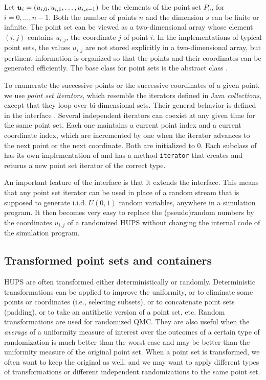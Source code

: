 Let $\mbox{\boldmath $u$}_i = (u_{i,0}, u_{i,1}, \dots, u_{i,s-1})$
be the elements of the point set $P_n$, for $i=0,\dots,n-1$.
Both the number of points $n$ and the dimension $s$ can be finite
or infinite.  The point set can be viewed as a two-dimensional array
whose element $(i,j)$ contains $u_{i,j}$, the coordinate $j$ of point $i$.
In the implementations of typical point sets, the values $u_{i,j}$ are
not stored explicitly in a two-dimensional array, but pertinent
information is organized so that the points and their coordinates can be
generated efficiently.  The base class for point sets is the abstract
class .

To enumerate the successive points or the successive coordinates of a
given point, we use \emph{point set iterators},
which resemble the iterators defined
in Java \emph{collections}, except that they loop over bi-dimensional sets.
Their general behavior is defined in the interface
 .
Several independent iterators can coexist at any given time for the same
point set.  Each one maintains a current point index and a current
coordinate index, which are incremented by one when the iterator advances
to the next point or the next coordinate.  Both are initialized to 0.
Each subclass of 
 has its own implementation of
 and has
 a method \texttt{iterator} that
creates and returns a new point set iterator of the correct type.

An important feature of the
 interface is that
it extends the 
 interface.  This means that any
point set iterator can be used in place of a random stream that is
supposed to generate i.i.d.{} $U(0,1)$ random variables, anywhere in a
simulation program.  It then becomes very easy to replace the
(pseudo)random numbers by the coordinates $u_{i,j}$ of a randomized HUPS
without changing the internal code of the simulation program.


\subsection*{Transformed point sets and containers}

HUPS are often transformed either deterministically or randomly.
Deterministic transformations can be applied to improve the uniformity,
or to eliminate some points or coordinates (i.e., selecting subsets),
or to concatenate point sets (padding), or to take an antithetic version
of a point set, etc.
Random transformations are used for randomized QMC.
They are also useful when the \emph{average} of a uniformity measure
of interest over the outcomes of a certain type of randomization is
much better than the worst case and may be better than the uniformity
measure of the original point set.
When a point set is transformed, we often want to keep the original
as well, and we may want to apply different types of transformations
or different independent randomizations to the same point set.

